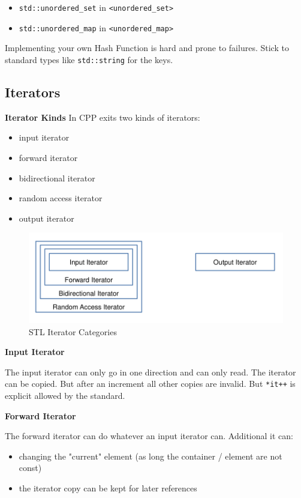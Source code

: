 \documentclass[11pt,twoside,landscape]{article}
\begin{document}
\begin{multicols}{3}
\begin{itemize}
\item \texttt{std::unordered\_set} in \texttt{<unordered\_set>}
\item \texttt{std::unordered\_map} in \texttt{<unordered\_map>}
\end{itemize}


Implementing your own Hash Function is hard and prone to failures.
Stick to standard types like \texttt{std::string} for the keys.

\subsection{Iterators}
\label{sec:orgb1cf7a3}
\textbf{Iterator Kinds}
In CPP exits two kinds of iterators:
\begin{itemize}
\item input iterator
\item forward iterator
\item bidirectional iterator
\item random access iterator
\item output iterator
\end{itemize}


\begin{figure}[htbp]
\centering
\includegraphics[width=.9\linewidth]{img/stl_iterator_categories.png}
\caption{STL Iterator Categories}
\end{figure}

\textbf{Input Iterator}

The input iterator can only go in one direction and can only read.
The iterator can be copied.
But after an increment all other copies are invalid.
But \texttt{*it++} is explicit allowed by the standard.

\textbf{Forward Iterator}

The forward iterator can do whatever an input iterator can.
Additional it can:
\begin{itemize}
\item changing the "current" element (as long the container / element are not const)
\item the iterator copy can be kept for later references
\end{itemize}


\end{multicols}
\end{document}
